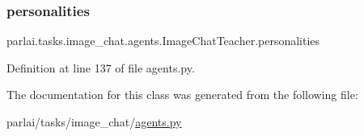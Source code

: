 \mbox{\label{classparlai_1_1tasks_1_1image__chat_1_1agents_1_1ImageChatTeacher_a3ba9be694ed33f16d9f3b4c6cc3f6a13}} 
\subsubsection{\texorpdfstring{personalities}{personalities}}
{\footnotesize\ttfamily parlai.\+tasks.\+image\+\_\+chat.\+agents.\+Image\+Chat\+Teacher.\+personalities}



Definition at line 137 of file agents.\+py.



The documentation for this class was generated from the following file\+:\begin{DoxyCompactItemize}
\item 
parlai/tasks/image\+\_\+chat/\hyperlink{parlai_2tasks_2image__chat_2agents_8py}{agents.\+py}\end{DoxyCompactItemize}
